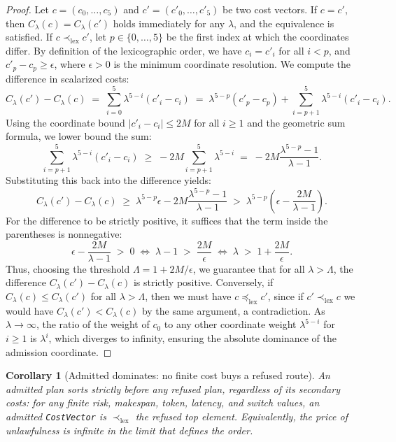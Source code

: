 \documentclass[11pt,oneside]{book}
\theoremstyle{definition}
\theoremstyle{plain}
\newtheorem{corollary}[theorem]{Corollary}
\theoremstyle{remark}
\newcommand{\code}[1]{\texttt{#1}}
\begin{document}
\begin{proof}
Let $c = (c_0, \dots, c_5)$ and $c' = (c'_0, \dots, c'_5)$ be two cost vectors.%
If $c = c'$, then $C_\lambda(c) = C_\lambda(c')$ holds immediately for any $\lambda$, and the equivalence is satisfied.%
If $c \prec_{\mathrm{lex}} c'$, let $p \in \{0, \dots, 5\}$ be the first index at which the coordinates differ.%
By definition of the lexicographic order, we have $c_i = c'_i$ for all $i < p$, and $c'_p - c_p \ge \epsilon$, where $\epsilon > 0$ is the minimum coordinate resolution.%
We compute the difference in scalarized costs:%
\[
C_\lambda(c') - C_\lambda(c) \;=\; \sum_{i=0}^{5} \lambda^{5-i}(c'_i - c_i) \;=\; \lambda^{5-p}(c'_p - c_p) + \sum_{i=p+1}^{5} \lambda^{5-i}(c'_i - c_i).%
\]
Using the coordinate bound $|c'_i - c_i| \le 2M$ for all $i \ge 1$ and the geometric sum formula, we lower bound the sum:%
\[
\sum_{i=p+1}^{5} \lambda^{5-i}(c'_i - c_i) \;\ge\; -2M \sum_{i=p+1}^{5} \lambda^{5-i} \;=\; -2M \frac{\lambda^{5-p} - 1}{\lambda - 1}.%
\]
Substituting this back into the difference yields:%
\[
C_\lambda(c') - C_\lambda(c) \;\ge\; \lambda^{5-p}\epsilon - 2M \frac{\lambda^{5-p} - 1}{\lambda - 1} \;>\; \lambda^{5-p} \left( \epsilon - \frac{2M}{\lambda - 1} \right).%
\]
For the difference to be strictly positive, it suffices that the term inside the parentheses is nonnegative:%
\[
\epsilon - \frac{2M}{\lambda - 1} \;>\; 0 \;\iff\; \lambda - 1 \;>\; \frac{2M}{\epsilon} \;\iff\; \lambda \;>\; 1 + \frac{2M}{\epsilon}.%
\]
Thus, choosing the threshold $\Lambda = 1 + 2M/\epsilon$, we guarantee that for all $\lambda > \Lambda$, the difference $C_\lambda(c') - C_\lambda(c)$ is strictly positive.%
Conversely, if $C_\lambda(c) \le C_\lambda(c')$ for all $\lambda > \Lambda$, then we must have $c \preceq_{\mathrm{lex}} c'$, since if $c' \prec_{\mathrm{lex}} c$ we would have $C_\lambda(c') < C_\lambda(c)$ by the same argument, a contradiction.%
As $\lambda \to \infty$, the ratio of the weight of $c_0$ to any other coordinate weight $\lambda^{5-i}$ for $i \ge 1$ is $\lambda^i$, which diverges to infinity, ensuring the absolute dominance of the admission coordinate.%
\end{proof}

\begin{corollary}[Admitted dominates: no finite cost buys a refused route]\label{cor:dominate}
An admitted plan sorts strictly before any refused plan, regardless of its secondary costs:
for any finite risk, makespan, token, latency, and switch values, an admitted
\code{CostVector} is $\prec_{\mathrm{lex}}$ the refused top element. Equivalently, the price of
unlawfulness is infinite in the limit that defines the order.
\end{corollary}
\end{document}

